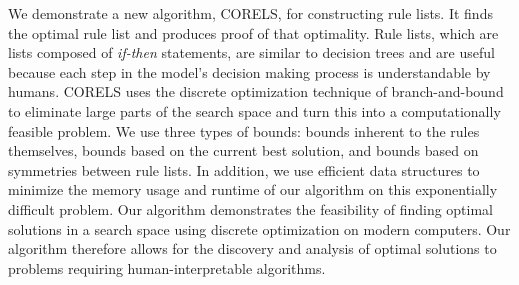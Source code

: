 
We demonstrate a new algorithm, CORELS, for constructing rule lists. It finds the optimal rule list and produces proof of that optimality. Rule lists, which are lists composed of \emph{if-then} statements, are similar to decision trees and are useful because each step in the model's decision making process is understandable by humans. CORELS uses the discrete optimization technique of branch-and-bound to eliminate large parts of the search space and turn this into a computationally feasible problem. We use three types of bounds: bounds inherent to the rules themselves, bounds based on the current best solution, and bounds based on symmetries between rule lists. In addition, we use efficient data structures to minimize the memory usage and runtime of our algorithm on this exponentially difficult problem. Our algorithm demonstrates the feasibility of finding optimal solutions in a search space using discrete optimization on modern computers. Our algorithm therefore allows for the discovery and analysis of optimal solutions to problems requiring human-interpretable algorithms.
